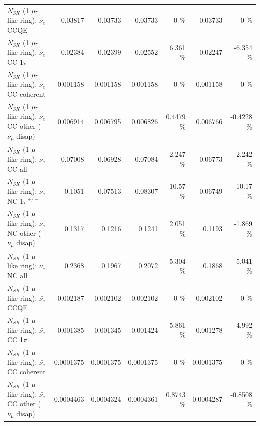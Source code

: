 \begin{table}
\begin{tabular}{| l | r | r | r  r | r  r |}
\hline
\hline
\hline
                                      $N_{SK}$ (1 $\mu$-like ring): $\nu_e$ CCQE &         0.03817 &         0.03733 &         0.03733 &        0 \%  &         0.03733 &        0 \%  \\ 
                                 $N_{SK}$ (1 $\mu$-like ring): $\nu_e$ CC 1$\pi$ &         0.02384 &         0.02399 &         0.02552 &    6.361 \%  &         0.02247 &   -6.354 \%  \\ 
                               $N_{SK}$ (1 $\mu$-like ring): $\nu_e$ CC coherent &        0.001158 &        0.001158 &        0.001158 &        0 \%  &        0.001158 &        0 \%  \\ 
                $N_{SK}$ (1 $\mu$-like ring): $\nu_e$ CC other ($\nu_\mu$ disap) &        0.006914 &        0.006795 &        0.006826 &   0.4479 \%  &        0.006766 &  -0.4228 \%  \\ 
                                  $N_{SK}$ (1 $\mu$-like ring): $\nu_{e}$ CC all &         0.07008 &         0.06928 &         0.07084 &    2.247 \%  &         0.06773 &   -2.242 \%  \\ 
\hline
                           $N_{SK}$ (1 $\mu$-like ring): $\nu_e$ NC 1$\pi^{+/-}$ &          0.1051 &         0.07513 &         0.08307 &    10.57 \%  &         0.06749 &   -10.17 \%  \\ 
                $N_{SK}$ (1 $\mu$-like ring): $\nu_e$ NC other ($\nu_\mu$ disap) &          0.1317 &          0.1216 &          0.1241 &    2.051 \%  &          0.1193 &   -1.869 \%  \\ 
                                  $N_{SK}$ (1 $\mu$-like ring): $\nu_{e}$ NC all &          0.2368 &          0.1967 &          0.2072 &    5.304 \%  &          0.1868 &   -5.041 \%  \\ 
\hline
\hline
\hline
                                $N_{SK}$ (1 $\mu$-like ring): $\bar{\nu_e}$ CCQE &        0.002187 &        0.002102 &        0.002102 &        0 \%  &        0.002102 &        0 \%  \\ 
                           $N_{SK}$ (1 $\mu$-like ring): $\bar{\nu_e}$ CC 1$\pi$ &        0.001385 &        0.001345 &        0.001424 &    5.861 \%  &        0.001278 &   -4.992 \%  \\ 
                         $N_{SK}$ (1 $\mu$-like ring): $\bar{\nu_e}$ CC coherent &       0.0001375 &       0.0001375 &       0.0001375 &        0 \%  &       0.0001375 &        0 \%  \\ 
          $N_{SK}$ (1 $\mu$-like ring): $\bar{\nu_e}$ CC other ($\nu_\mu$ disap) &       0.0004463 &       0.0004324 &       0.0004361 &   0.8743 \%  &       0.0004287 &  -0.8508 \%  \\ 

\end{tabular}
\end{table}
